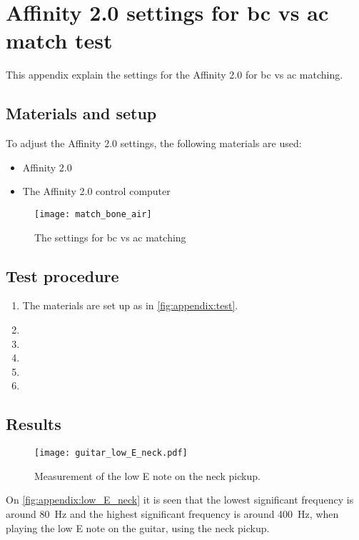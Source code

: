 \chapter*{Affinity 2.0 settings for \gls{bc} vs \gls{ac} match test}
This appendix explain the settings for the Affinity 2.0 for \gls{bc} vs \gls{ac} matching.

\section*{Materials and setup}
To adjust the Affinity 2.0 settings, the following materials are used:
\begin{itemize}
\item Affinity 2.0
\item The Affinity 2.0 control computer
\end{itemize}

\begin{figure}[H]
	\centering
		\texttt{[image: match\_bone\_air]}
		\caption{The settings for  \gls{bc} vs \gls{ac} matching}
		\label{fig:apend_match_bone_air}
\end{figure}

\section*{Test procedure}


\begin{enumerate}
\item The materials are set up as in \autoref{fig:appendix:test}.
\item 
\item  
\item  
\item 
\item 
\end{enumerate}

\section*{Results}

\begin{figure}[htbp!]
	\centering
		\texttt{[image: guitar\_low\_E\_neck.pdf]}
		\caption{Measurement of the low E note on the neck pickup.}
		\label{fig:appendix:low_E_neck}
\end{figure}

On  \autoref{fig:appendix:low_E_neck} it is seen that the lowest significant frequency is around \SI{80}{\hertz} and the highest significant frequency is around \SI{400}{\hertz}, when playing the low E note on the guitar, using the neck pickup.
